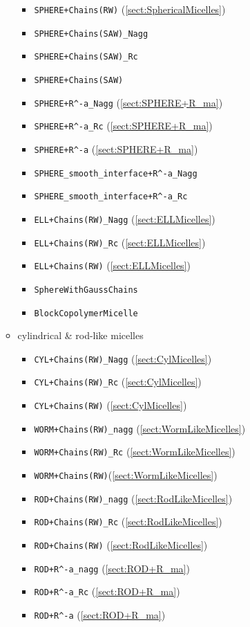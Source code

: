 \begin{itemize}
\begin{itemize}
\begin{itemize}
\item \texttt{SPHERE+Chains(RW)} (\ref{sect:SphericalMicelles})
\item \texttt{SPHERE+Chains(SAW)\_Nagg}
\item \texttt{SPHERE+Chains(SAW)\_Rc}
\item \texttt{SPHERE+Chains(SAW)}
\item \texttt{SPHERE+R\^{}-a\_Nagg} (\ref{sect:SPHERE+R_ma})
\item \texttt{SPHERE+R\^{}-a\_Rc} (\ref{sect:SPHERE+R_ma})
\item \texttt{SPHERE+R\^{}-a} (\ref{sect:SPHERE+R_ma})
\item \texttt{SPHERE\_smooth\_interface+R\^{}-a\_Nagg}
\item \texttt{SPHERE\_smooth\_interface+R\^{}-a\_Rc}
\item \texttt{ELL+Chains(RW)\_Nagg} (\ref{sect:ELLMicelles})
\item \texttt{ELL+Chains(RW)\_Rc} (\ref{sect:ELLMicelles})
\item \texttt{ELL+Chains(RW)} (\ref{sect:ELLMicelles})
\item \texttt{SphereWithGaussChains}
\item \texttt{BlockCopolymerMicelle}
\end{itemize}
\item cylindrical \& rod-like micelles
\begin{itemize}
\item \texttt{CYL+Chains(RW)\_Nagg} (\ref{sect:CylMicelles})
\item \texttt{CYL+Chains(RW)\_Rc} (\ref{sect:CylMicelles})
\item \texttt{CYL+Chains(RW)} (\ref{sect:CylMicelles})
\item \texttt{WORM+Chains(RW)\_nagg} (\ref{sect:WormLikeMicelles})
\item \texttt{WORM+Chains(RW)\_Rc} (\ref{sect:WormLikeMicelles})
\item \texttt{WORM+Chains(RW)}(\ref{sect:WormLikeMicelles})
\item \texttt{ROD+Chains(RW)\_nagg} (\ref{sect:RodLikeMicelles})
\item \texttt{ROD+Chains(RW)\_Rc} (\ref{sect:RodLikeMicelles})
\item \texttt{ROD+Chains(RW)} (\ref{sect:RodLikeMicelles})
\item \texttt{ROD+R\^{}-a\_nagg} (\ref{sect:ROD+R_ma})
\item \texttt{ROD+R\^{}-a\_Rc} (\ref{sect:ROD+R_ma})
\item \texttt{ROD+R\^{}-a} (\ref{sect:ROD+R_ma})

\end{itemize}
\end{itemize}
\end{itemize}
